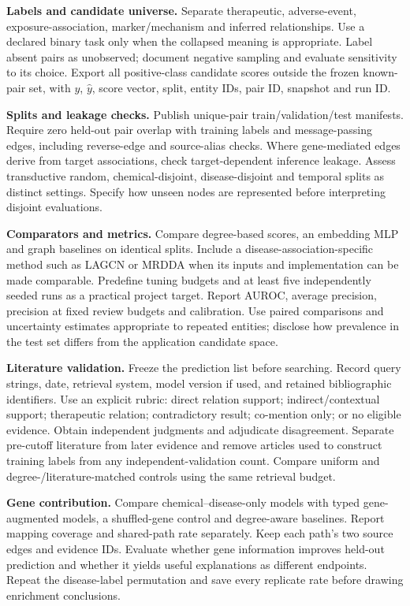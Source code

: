 \textbf{Labels and candidate universe.} Separate therapeutic, adverse-event, exposure-association, marker/mechanism and inferred relationships. Use a declared binary task only when the collapsed meaning is appropriate. Label absent pairs as unobserved; document negative sampling and evaluate sensitivity to its choice. Export all positive-class candidate scores outside the frozen known-pair set, with $y$, $\hat y$, score vector, split, entity IDs, pair ID, snapshot and run ID.

\textbf{Splits and leakage checks.} Publish unique-pair train/validation/test manifests. Require zero held-out pair overlap with training labels and message-passing edges, including reverse-edge and source-alias checks. Where gene-mediated edges derive from target associations, check target-dependent inference leakage. Assess transductive random, chemical-disjoint, disease-disjoint and temporal splits as distinct settings. Specify how unseen nodes are represented before interpreting disjoint evaluations.

\textbf{Comparators and metrics.} Compare degree-based scores, an embedding MLP and graph baselines on identical splits. Include a disease-association-specific method such as LAGCN or MRDDA when its inputs and implementation can be made comparable. Predefine tuning budgets and at least five independently seeded runs as a practical project target. Report AUROC, average precision, precision at fixed review budgets and calibration. Use paired comparisons and uncertainty estimates appropriate to repeated entities; disclose how prevalence in the test set differs from the application candidate space.

\textbf{Literature validation.} Freeze the prediction list before searching. Record query strings, date, retrieval system, model version if used, and retained bibliographic identifiers. Use an explicit rubric: direct relation support; indirect/contextual support; therapeutic relation; contradictory result; co-mention only; or no eligible evidence. Obtain independent judgments and adjudicate disagreement. Separate pre-cutoff literature from later evidence and remove articles used to construct training labels from any independent-validation count. Compare uniform and degree-/literature-matched controls using the same retrieval budget.

\textbf{Gene contribution.} Compare chemical--disease-only models with typed gene-augmented models, a shuffled-gene control and degree-aware baselines. Report mapping coverage and shared-path rate separately. Keep each path's two source edges and evidence IDs. Evaluate whether gene information improves held-out prediction and whether it yields useful explanations as different endpoints. Repeat the disease-label permutation and save every replicate rate before drawing enrichment conclusions.

